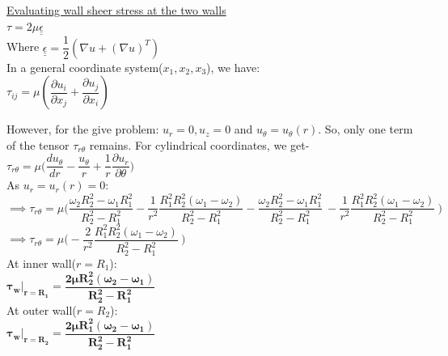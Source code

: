 \documentclass{article}
\def\doubleunderline#1{\underline{\underline{#1}}}
\begin{document}
\noindent \underline{Evaluating wall sheer stress at the two walls}\\
$\tau= 2\mu \doubleunderline{\epsilon}$\\
Where $\doubleunderline{\epsilon}= \dfrac{1}{2}(\nabla u + (\nabla u) ^T)$\\
In a general coordinate system($x_1,x_2,x_3$), we have: \\
$\tau_{ij}=\mu(\dfrac{\partial u_i}{\partial x_j} + \dfrac{\partial u_j}{\partial x_i})$

\noindent However, for the give problem: $u_r=0, u_z=0$ and $u_\theta=u_\theta(r)$. So, only one term of the tensor $\tau_{r\theta}$ remains. For cylindrical coordinates, we get- \\
$\tau_{r\theta}=\mu\Big (\dfrac{du_\theta}{dr}- \dfrac{u_{\theta}}{r} +\dfrac{1}{r}\dfrac{\partial u_r}{\partial \theta} \Big )$\\
As $u_r=u_r(r)=0$:\\

\noindent$\implies \tau_{r\theta}=\mu\Big (\dfrac{\omega_2 R_2^2- \omega_1R_1^2}{R_2^2-R_1^2} -\dfrac{1}{r^2}\dfrac{R_1^2R_2^2(\omega_1-\omega_2)}{R_2^2-R_1^2} - \dfrac{\omega_2R_2^2- \omega_1R_1^2}{R_2^2-R_1^2}\ - \dfrac{1}{r^2}\dfrac{R_1^2R_2^2(\omega_1-\omega_2)}{R_2^2-R_1^2} \  \Big ) $ \\
$\implies \tau_{r\theta}=\mu\Big (-\dfrac{2}{r^2}\dfrac{R_1^2R_2^2(\omega_1-\omega_2)}{R_2^2-R_1^2} \  \Big ) $ \\

\noindent At inner wall($r=R_1$):\\
$\mathbf{\tau_{w}\bigg\rvert_{r=R_1}= \dfrac{2\mu R_2^2(\omega_2-\omega_1)}{R_2^2-R_1^2}}$\\

\noindent At outer wall($r=R_2$):\\
$\mathbf{\tau_{w}\bigg\rvert_{r=R_2}= \dfrac{2\mu R_1^2(\omega_2-\omega_1)}{R_2^2-R_1^2}}$\\

\bigbreak
\bigbreak
\end{document}
